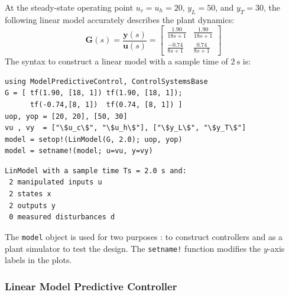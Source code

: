 At the steady-state operating point $u_c=u_h=20$, $y_L=50$, and $y_T=30$, the following linear model accurately describes the plant dynamics:
\begin{equation}
\mathbf{G}(s) = \frac{\mathbf{y}(s)}{\mathbf{u}(s)} =
\begin{bmatrix}
    \frac{1.90}{18s+1} & \frac{1.90}{18s+1} \\[3pt]
    \frac{-0.74}{8s+1} & \frac{0.74}{8s+1}
\end{bmatrix}
\end{equation}
The syntax to construct a linear model with a sample time of $\SI{2}{\second}$ is:
\begin{verbatim}
using ModelPredictiveControl, ControlSystemsBase
G = [ tf(1.90, [18, 1]) tf(1.90, [18, 1]);
      tf(-0.74,[8, 1])  tf(0.74, [8, 1]) ]
uop, yop = [20, 20], [50, 30]
vu , vy  = ["\$u_c\$", "\$u_h\$"], ["\$y_L\$", "\$y_T\$"]
model = setop!(LinModel(G, 2.0); uop, yop)
model = setname!(model; u=vu, y=vy)
\end{verbatim}
\spacerepl
\begin{verbatim}
LinModel with a sample time Ts = 2.0 s and:
 2 manipulated inputs u
 2 states x
 2 outputs y
 0 measured disturbances d
\end{verbatim}
The \texttt{model} object is used for two purposes : to construct controllers and as a plant simulator to test the design. The \texttt{setname!} function modifies the $y$-axis labels in the plots.

\subsubsection{Linear Model Predictive Controller}

